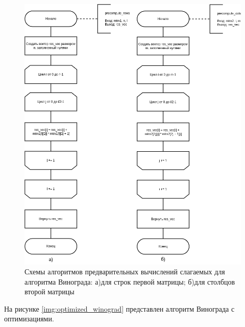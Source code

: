 \begin{figure}[H]
	\begin{center}
		\includegraphics[scale=0.6]{img/winograd_precompute.png}
	\end{center}
	\captionsetup{justification=centering}
	\caption{Схемы алгоритмов предварительных вычислений слагаемых для алгоритма Винограда: а)для строк первой матрицы; б)для столбцов второй матрицы}
	\label{img:winograd_precompute}
\end{figure}

На рисунке \ref{img:optimized_winograd} представлен алгоритм Винограда с оптимизациями.

